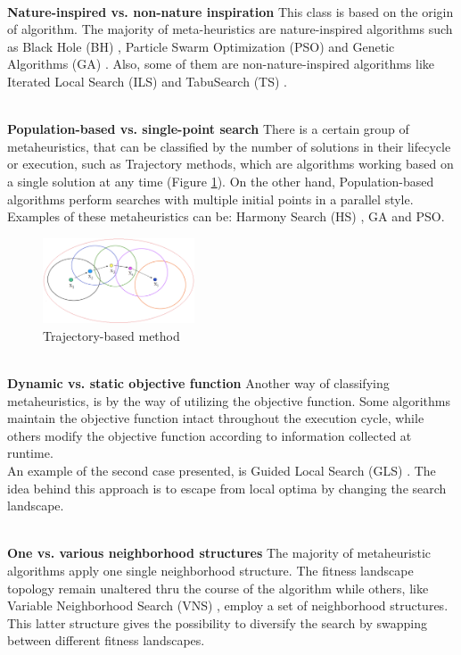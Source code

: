 ~\\
\textbf{Nature-inspired vs. non-nature inspiration }
This class is based on the origin of algorithm. The majority of meta-heuristics are nature-inspired algorithms such as Black Hole (BH) \cite{Rubio2016}, Particle Swarm Optimization (PSO) \cite{Duran:2010:CPS:1645454.1645859} and Genetic Algorithms (GA) \cite{DBLP:conf/icsi/CrawfordSPJPO14}. Also, some of them are non-nature-inspired algorithms like Iterated Local Search (ILS) \cite{DBLP:journals/networks/AringhieriGHS16} and TabuSearch (TS) \cite{DBLP:journals/eswa/SotoCGMP13}.

~\\
\textbf{Population-based vs. single-point search}
There is a certain group of metaheuristics, that can be classified by the number of solutions in their lifecycle or execution, such as Trajectory methods, which are algorithms working based on a single solution at any time (Figure \ref{fig:trajectory-method}). On the other hand, Population-based algorithms perform searches with multiple initial points in a parallel style. Examples of these metaheuristics can be: Harmony Search (HS) \cite{DBLP:conf/ccece/Al-AjmiE14}, GA \cite{Aupetit2008} and PSO. 

\squeezeup
\begin{figure}[ht]
	\centering
  \includegraphics[width=0.4\textwidth]{MarcoTeorico/imagenes/trajectory-mh.png}
	\caption{Trajectory-based method}\label{fig:trajectory-method}
\end{figure}
\squeezeup

~\\
\textbf{Dynamic vs. static objective function}
Another way of classifying metaheuristics, is by the way of utilizing the objective function. Some algorithms maintain the objective function intact throughout the execution cycle, while others modify the objective function according to information collected at runtime.\\
An example of the second case presented, is Guided Local Search (GLS) \cite{DBLP:journals/eor/VansteenwegenSBO09}.  The idea behind this approach is to escape from local optima by changing the search landscape. 

~\\
\textbf{One vs. various neighborhood structures}
The majority of metaheuristic algorithms apply one single neighborhood structure. The fitness landscape topology remain unaltered thru the course of the algorithm while others, like Variable Neighborhood Search (VNS) \cite{DBLP:journals/anor/SarasolaDSA16}, employ a set of neighborhood structures. This latter structure gives the possibility to diversify the search by swapping between different fitness landscapes.

